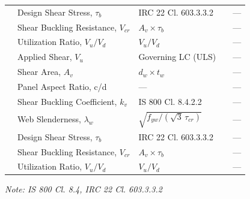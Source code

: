 \documentclass[12pt,a4paper]{report}
\numberwithin{table}{chapter}
\numberwithin{figure}{chapter}
\begin{document}
\begin{longtable}{|C{2.5cm}|C{3.5cm}|C{3.5cm}|>{\centering\arraybackslash}p{4.2cm}|C{1.8cm}|}
 & Design Shear Stress, $\tau_b$ & IRC 22 Cl. 603.3.3.2 &  & --- \\[6pt]
 & Shear Buckling Resistance, $V_{cr}$ & $A_v \times \tau_b$ &  & --- \\[6pt]
 & Utilization Ratio, $V_u / V_d$ & $V_u / V_d$ &  & --- \\[6pt]
\hline
{} & Applied Shear, $V_u$ & Governing LC (ULS) &  & --- \\[6pt]
 & Shear Area, $A_v$ & $d_w \times t_w$ &  & --- \\[6pt]
 & Panel Aspect Ratio, c/d & --- &  & --- \\[6pt]
 & Shear Buckling Coefficient, $k_v$ & IS 800 Cl. 8.4.2.2 &  & --- \\[6pt]
 & Web Slenderness, $\lambda_w$ & $\sqrt{f_{yw}/(\sqrt{3}\,\tau_{cr})}$ &  & --- \\[6pt]
 & Design Shear Stress, $\tau_b$ & IRC 22 Cl. 603.3.3.2 &  & --- \\[6pt]
 & Shear Buckling Resistance, $V_{cr}$ & $A_v \times \tau_b$ &  & --- \\[6pt]
 & Utilization Ratio, $V_u / V_d$ & $V_u / V_d$ &  & --- \\[6pt]
\hline
\end{longtable}
\noindent\textit{Note: IS 800 Cl. 8.4, IRC 22 Cl. 603.3.3.2}
\end{document}
